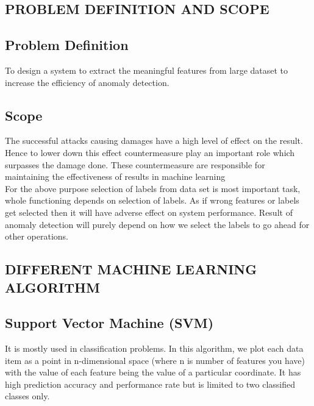 \documentclass[a4paper, 12pt]{article}
\begin{document}
\newpage
\begin{center}
\section{PROBLEM DEFINITION AND SCOPE}
\end{center}

\subsection{Problem Definition}

\hspace{1.5cm} To design a system to extract the meaningful features from large dataset to increase the efficiency of anomaly detection.

\subsection{Scope}

\hspace{1.5cm} The successful attacks causing damages have a high level of effect on the result. Hence to lower down this effect countermeasure play an important role which surpasses the damage done. These countermeasure are responsible for maintaining the effectiveness of results in machine learning \\

\hspace{1.5cm} For the above purpose selection of labels from data set is most important task, whole functioning depends on selection of labels. As if wrong features or labels get selected then it will have adverse effect on system performance.
\hspace{1.5cm} Result of anomaly detection will purely depend on how we select the labels to go ahead for other operations.
\newpage
\begin{center}
\section{DIFFERENT MACHINE LEARNING ALGORITHM}
\end{center}
\subsection{Support Vector Machine (SVM)}
\par
\hspace
It is mostly used in classification problems. In this algorithm, we plot each data item as a point in n-dimensional space (where n is number of features you have) with the value of each feature being the value of a particular coordinate. It has high prediction
accuracy and performance rate but is limited to two classified classes only.
\\
\\
\end{document}

